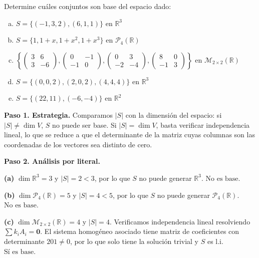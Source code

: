 \begin{prob} Determine cuáles conjuntos son base del espacio dado:
\begin{enumerate}[(a)]
\item $S=\{(-1,3,2), (6,1,1)\}$ en $\mathbb{R}^3$
\item $S=\{1, 1+x, 1+x^2, 1+x^3\}$ en $\mathcal{P}_4(\mathbb{R})$
\item $\left\{\begin{pmatrix}3&6\\3&-6\end{pmatrix}, \begin{pmatrix}0&-1\\-1&0\end{pmatrix}, \begin{pmatrix}0&3\\-2&-4\end{pmatrix}, \begin{pmatrix}8&0\\-1&3\end{pmatrix}\right\}$ en $\mathcal{M}_{2\times2}(\mathbb{R})$
\item $S=\{(0,0,2), (2,0,2), (4,4,4)\}$ en $\mathbb{R}^3$
\item $S=\{(22,11), (-6,-4)\}$ en $\mathbb{R}^2$
\end{enumerate}

\begin{myproof}
\textbf{Paso 1. Estrategia.} Comparamos $|S|$ con la dimensión del espacio: si $|S| \neq \dim V$, $S$ no puede ser base. Si $|S| = \dim V$, basta verificar independencia lineal, lo que se reduce a que el determinante de la matriz cuyas columnas son las coordenadas de los vectores sea distinto de cero.

\textbf{Paso 2. Análisis por literal.}

\textbf{(a)} $\dim \mathbb{R}^3 = 3$ y $|S|=2 < 3$, por lo que $S$ no puede generar $\mathbb{R}^3$. $\boxed{\text{No es base.}}$

\textbf{(b)} $\dim \mathcal{P}_4(\mathbb{R}) = 5$ y $|S|=4 < 5$, por lo que $S$ no puede generar $\mathcal{P}_4(\mathbb{R})$. $\boxed{\text{No es base.}}$

\textbf{(c)} $\dim \mathcal{M}_{2\times2}(\mathbb{R}) = 4$ y $|S|=4$. Verificamos independencia lineal resolviendo $\sum k_i A_i = \mathbf{0}$. El sistema homogéneo asociado tiene matriz de coeficientes con determinante $201 \neq 0$, por lo que solo tiene la solución trivial y $S$ es l.i. $\boxed{\text{Sí es base.}}$


\end{myproof}
\end{prob}
